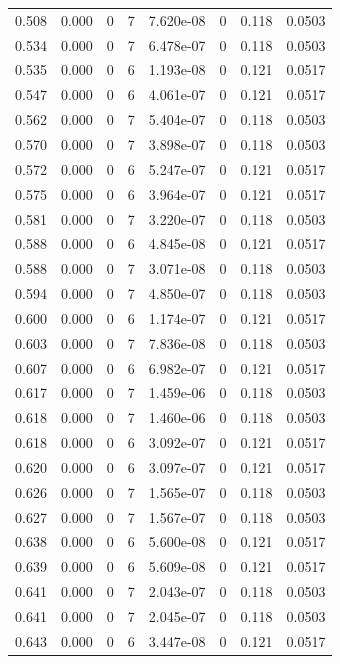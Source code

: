 \documentclass[preview]{standalone}
\begin{document}
{{{\begin{tabular}{L{1.2cm}C{1.2cm} C{0.3cm}C{0.5cm} C{1.4cm}C{1.4cm} C{1.4cm}C{1.4cm}}
  0.508  &  0.000  & 0     &  7 &  7.620e-08  & 0  & 0.118 &  0.0503   \\ 
  0.534  &  0.000  & 0     &  7 &  6.478e-07  & 0  & 0.118 &  0.0503   \\ 
  0.535  &  0.000  & 0     &  6 &  1.193e-08  & 0  & 0.121 &  0.0517   \\ 
  0.547  &  0.000  & 0     &  6 &  4.061e-07  & 0  & 0.121 &  0.0517   \\ 
  0.562  &  0.000  & 0     &  7 &  5.404e-07  & 0  & 0.118 &  0.0503   \\ 
  0.570  &  0.000  & 0     &  7 &  3.898e-07  & 0  & 0.118 &  0.0503   \\ 
  0.572  &  0.000  & 0     &  6 &  5.247e-07  & 0  & 0.121 &  0.0517   \\ 
  0.575  &  0.000  & 0     &  6 &  3.964e-07  & 0  & 0.121 &  0.0517   \\ 
  0.581  &  0.000  & 0     &  7 &  3.220e-07  & 0  & 0.118 &  0.0503   \\ 
  0.588  &  0.000  & 0     &  6 &  4.845e-08  & 0  & 0.121 &  0.0517   \\ 
  0.588  &  0.000  & 0     &  7 &  3.071e-08  & 0  & 0.118 &  0.0503   \\ 
  0.594  &  0.000  & 0     &  7 &  4.850e-07  & 0  & 0.118 &  0.0503   \\ 
  0.600  &  0.000  & 0     &  6 &  1.174e-07  & 0  & 0.121 &  0.0517   \\ 
  0.603  &  0.000  & 0     &  7 &  7.836e-08  & 0  & 0.118 &  0.0503   \\ 
  0.607  &  0.000  & 0     &  6 &  6.982e-07  & 0  & 0.121 &  0.0517   \\ 
  0.617  &  0.000  & 0     &  7 &  1.459e-06  & 0  & 0.118 &  0.0503   \\ 
  0.618  &  0.000  & 0     &  7 &  1.460e-06  & 0  & 0.118 &  0.0503   \\ 
  0.618  &  0.000  & 0     &  6 &  3.092e-07  & 0  & 0.121 &  0.0517   \\ 
  0.620  &  0.000  & 0     &  6 &  3.097e-07  & 0  & 0.121 &  0.0517   \\ 
  0.626  &  0.000  & 0     &  7 &  1.565e-07  & 0  & 0.118 &  0.0503   \\ 
  0.627  &  0.000  & 0     &  7 &  1.567e-07  & 0  & 0.118 &  0.0503   \\ 
  0.638  &  0.000  & 0     &  6 &  5.600e-08  & 0  & 0.121 &  0.0517   \\ 
  0.639  &  0.000  & 0     &  6 &  5.609e-08  & 0  & 0.121 &  0.0517   \\ 
  0.641  &  0.000  & 0     &  7 &  2.043e-07  & 0  & 0.118 &  0.0503   \\ 
  0.641  &  0.000  & 0     &  7 &  2.045e-07  & 0  & 0.118 &  0.0503   \\ 
  0.643  &  0.000  & 0     &  6 &  3.447e-08  & 0  & 0.121 &  0.0517   \\ 
\hline 
\end{tabular} 

}}}
\end{document}
